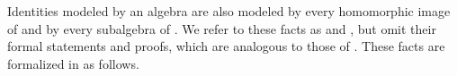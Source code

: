 \fi
Identities modeled by an algebra  are also modeled by every homomorphic image of
 and by every subalgebra of .
\ifshort
We refer to these facts as  and , but omit their formal
statements and proofs, which are analogous to those of .
\else
These facts are formalized in \agda as follows.

\begin{code}%
\>[0]\<%
\\
\>[0]\AgdaSpace{}%
\AgdaModule{\AgdaUnderscore{}}\AgdaSpace{}%
\AgdaSymbol{\{}\AgdaSpace{}%
\AgdaSymbol{:}\AgdaSpace{}%
\AgdaSpace{}%
\AgdaSymbol{\}\{}\AgdaSpace{}%
\AgdaSymbol{:}\AgdaSpace{}%
\AgdaSpace{}%
\AgdaSpace{}%
\AgdaSymbol{\}\{}\AgdaSpace{}%
\AgdaSymbol{:}\AgdaSpace{}%
\AgdaSpace{}%
\AgdaSpace{}%
\AgdaSymbol{\}\{}\AgdaSpace{}%
\AgdaSpace{}%
\AgdaSymbol{:}\AgdaSpace{}%
\AgdaSpace{}%
\AgdaSymbol{\}}\AgdaSpace{}%
\<%
\\
%
\\[\AgdaEmptyExtraSkip]%
\>[0][@{}l@{\AgdaIndent{0}}]%
\>[1]\AgdaSpace{}%
\AgdaSymbol{:}\AgdaSpace{}%
\AgdaSpace{}%
\AgdaSpace{}%
\AgdaSpace{}%
\AgdaSpace{}%
\AgdaSpace{}%
\AgdaSpace{}%
\AgdaSpace{}%
\AgdaSpace{}%
\AgdaSpace{}%
\AgdaSpace{}%
\AgdaSpace{}%
\AgdaSpace{}%
\AgdaSpace{}%
\AgdaSpace{}%
\<%
\\
%
\>[1]\AgdaSpace{}%
\AgdaSpace{}%
\AgdaSymbol{(}\AgdaSpace{}%
\AgdaOperator{\AgdaInductiveConstructor{,}}\AgdaSpace{}%
\AgdaSymbol{)}\AgdaSpace{}%
\AgdaSpace{}%
\AgdaSymbol{=}\<%
\\
\>[1][@{}l@{\AgdaIndent{0}}]%
\>[2]\<%
\\
\>[2][@{}l@{\AgdaIndent{0}}]%
\>[7]\AgdaSpace{}%
\AgdaSpace{}%
%
\>[15]%
\>[33]%

\end{code}
